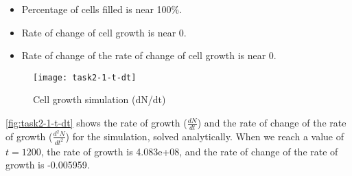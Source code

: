 \begin{itemize}
    \item Percentage of cells filled is near 100\%.
    \item Rate of change of cell growth is near 0.
    \item Rate of change of the rate of change of cell growth is near 0.
\end{itemize}

\begin{figure}[ht]
    \centering
    \texttt{[image: task2-1-t-dt]}
    \caption[Cell growth simulation (dN/dt)]{Cell growth simulation (dN/dt)}
    \label{fig:task2-1-t-dt}
\end{figure}









\autoref{fig:task2-1-t-dt} shows the rate of growth ($\frac{dN}{dt}$) and the rate of change of the rate of growth ($\frac{d^2N}{dt^2}$) for the simulation, solved analytically.
When we reach a value of $t = 1200$, the rate of growth is 4.083e+08, and the rate of change of the rate of growth is -0.005959.

